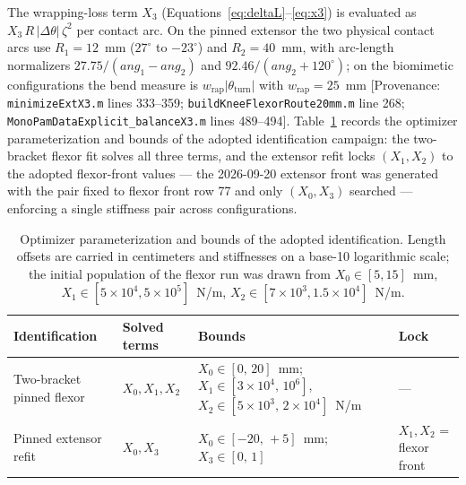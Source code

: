 The wrapping-loss term $X_{3}$ (Equations~\ref{eq:deltaL}--\ref{eq:x3}) is evaluated as $X_{3}\,R\,\lvert\Delta\theta\rvert\,\zeta^{2}$ per contact arc. On the pinned extensor the two physical contact arcs use $R_{1} = 12$~mm ($27^{\circ}$ to $-23^{\circ}$) and $R_{2} = 40$~mm, with arc-length normalizers $27.75/(ang_{1} - ang_{2})$ and $92.46/(ang_{2}+120^{\circ})$; on the biomimetic configurations the bend measure is $w_{\text{rap}}\lvert\theta_{\text{turn}}\rvert$ with $w_{\text{rap}} = 25$~mm [Provenance: \texttt{minimizeExtX3.m} lines 333--359; \texttt{buildKneeFlexorRoute20mm.m} line 268; \texttt{MonoPamDataExplicit\_balanceX3.m} lines 489--494]. Table~\ref{tab:app_opt_bounds} records the optimizer parameterization and bounds of the adopted identification campaign: the two-bracket flexor fit solves all three terms, and the extensor refit locks $(X_{1}, X_{2})$ to the adopted flexor-front values --- the 2026-09-20 extensor front was generated with the pair fixed to flexor front row 77 and only $(X_{0}, X_{3})$ searched --- enforcing a single stiffness pair across configurations.

\begin{table}[htbp]
\caption{Optimizer parameterization and bounds of the adopted identification. Length offsets are carried in centimeters and stiffnesses on a base-10 logarithmic scale; the initial population of the flexor run was drawn from $X_{0}\in[5,15]$~mm, $X_{1}\in[5\times10^{4}, 5\times10^{5}]$~N/m, $X_{2}\in[7\times10^{3}, 1.5\times10^{4}]$~N/m.}
\label{tab:app_opt_bounds}
\begin{tabular}{@{}llll@{}}
\toprule
\textbf{Identification} & \textbf{Solved terms} & \textbf{Bounds} & \textbf{Lock} \\
\midrule
Two-bracket pinned flexor & $X_{0}, X_{1}, X_{2}$ & $X_{0}\in[0,\,20]$~mm; $X_{1}\in[3\times10^{4},\,10^{6}]$, $X_{2}\in[5\times10^{3},\,2\times10^{4}]$~N/m & --- \\
Pinned extensor refit & $X_{0}, X_{3}$ & $X_{0}\in[-20,\,+5]$~mm; $X_{3}\in[0,\,1]$ & $X_{1}, X_{2}$ = flexor front \\
\bottomrule
\end{tabular}
\end{table}


